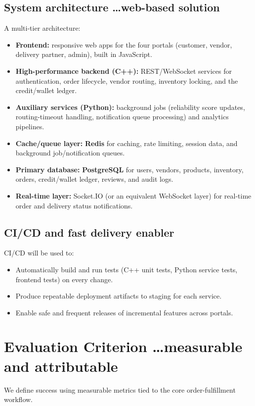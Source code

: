 \documentclass{article}
\begin{document}
\subsection{System architecture \dots web-based solution}
A multi-tier architecture:
\begin{itemize}
    \item \textbf{Frontend:} responsive web apps for the four portals (customer, vendor,
    delivery partner, admin), built in JavaScript.
    \item \textbf{High-performance backend (C++):} REST/WebSocket services for authentication,
    order lifecycle, vendor routing, inventory locking, and the credit/wallet ledger.
    \item \textbf{Auxiliary services (Python):} background jobs (reliability score updates,
    routing-timeout handling, notification queue processing) and analytics pipelines.
    \item \textbf{Cache/queue layer:} \textbf{Redis} for caching, rate limiting, session data,
    and background job/notification queues.
    \item \textbf{Primary database:} \textbf{PostgreSQL} for users, vendors, products,
    inventory, orders, credit/wallet ledger, reviews, and audit logs.
    \item \textbf{Real-time layer:} Socket.IO (or an equivalent WebSocket layer) for real-time
    order and delivery status notifications.
\end{itemize}

\subsection{CI/CD and fast delivery enabler}
CI/CD will be used to:
\begin{itemize}
    \item Automatically build and run tests (C++ unit tests, Python service tests, frontend
    tests) on every change.
    \item Produce repeatable deployment artifacts to staging for each service.
    \item Enable safe and frequent releases of incremental features across portals.
\end{itemize}

\section{Evaluation Criterion \dots measurable and attributable}
We define success using measurable metrics tied to the core order-fulfillment workflow.
\end{document}
